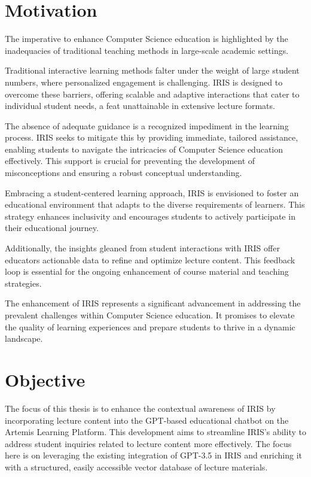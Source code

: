 \documentclass[a4paper,12pt,twoside]{article}
\begin{document}
        
\section{Motivation}
       The imperative to enhance Computer Science education is highlighted by the inadequacies of traditional teaching methods in large-scale academic settings.

        Traditional interactive learning methods falter under the weight of large student numbers, where personalized engagement is challenging. IRIS is designed to overcome these barriers, offering scalable and adaptive interactions that cater to individual student needs, a feat unattainable in extensive lecture formats.

        The absence of adequate guidance is a recognized impediment in the learning process.\cite{3}\cite{5} IRIS seeks to mitigate this by providing immediate, tailored assistance, enabling students to navigate the intricacies of Computer Science education effectively. This support is crucial for preventing the development of misconceptions and ensuring a robust conceptual understanding.

        Embracing a student-centered learning approach, IRIS is envisioned to foster an educational environment that adapts to the diverse requirements of learners. This strategy enhances inclusivity and encourages students to actively participate in their educational journey.

        Additionally, the insights gleaned from student interactions with IRIS offer educators actionable data to refine and optimize lecture content. This feedback loop is essential for the ongoing enhancement of course material and teaching strategies.

        The enhancement of IRIS represents a significant advancement in addressing the prevalent challenges within Computer Science education. It promises to elevate the quality of learning experiences and prepare students to thrive in a dynamic landscape.
        
\section{Objective}
The focus of this thesis is to enhance the contextual awareness of IRIS by incorporating lecture content into the GPT-based educational chatbot on the Artemis Learning Platform. This development aims to streamline IRIS's ability to address student inquiries related to lecture content more effectively. The focus here is on leveraging the existing integration of GPT-3.5 in IRIS and enriching it with a structured, easily accessible vector database of lecture materials.\cite{6}
\end{document}

